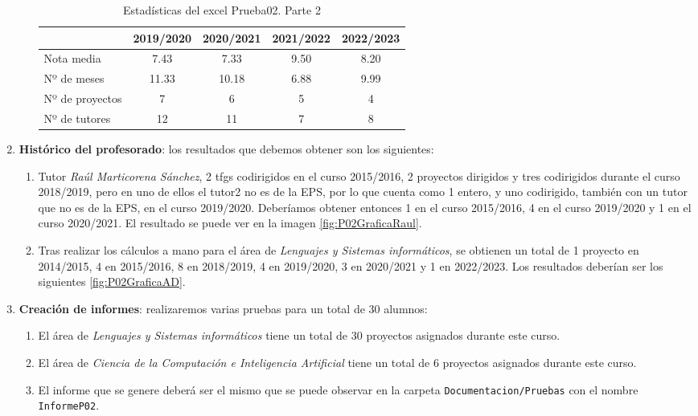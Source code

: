 \begin{enumerate}
\begin{enumerate}
	\begin{table}[]
		\label{P02Historico2}
		\centering
		\begin{tabular}{|l|c|c|c|c|}
			\hline
			\multicolumn{1}{|c|}{\textbf{}} & \textbf{2019/2020}
			& \textbf{2020/2021}	& \textbf{2021/2022} & \textbf{2022/2023}\\\hline
			Nota media & 7.43 &7.33 & 9.50& 8.20 \\ \hline
			Nº de meses  & 11.33 & 10.18& 6.88	& 9.99 \\ \hline
			Nº de proyectos    &7  &6 & 5	&4  \\ \hline
			Nº de tutores  & 12 &11 & 7	& 8   \\ \hline
		\end{tabular}
		\caption{Estadísticas del excel Prueba02. Parte 2}
	\end{table}
		
	\end{enumerate}
	
	\item \textbf{Histórico del profesorado}:  los resultados que debemos obtener son los siguientes:
	\begin{enumerate}
		\item Tutor \emph{Raúl Marticorena Sánchez}, 2 tfgs codirigidos en el curso 2015/2016, 2 proyectos dirigidos y tres codirigidos durante el curso 2018/2019, pero en uno de ellos el tutor2 no es de la EPS, por lo que cuenta como 1 entero, y uno codirigido, también con un tutor que no es de la EPS, en el curso 2019/2020. Deberíamos obtener entonces 1 en el curso 2015/2016, 4 en el curso 2019/2020 y 1 en el curso 2020/2021. El resultado se puede ver en la imagen \ref{fig:P02GraficaRaul}.
		
		\item Tras realizar los cálculos a mano para el área de  \emph{Lenguajes y Sistemas informáticos}, se obtienen un total de 1 proyecto en 2014/2015, 4 en 2015/2016, 8 en 2018/2019, 4 en 2019/2020, 3 en 2020/2021 y 1 en 2022/2023. Los resultados deberían ser los siguientes \ref{fig:P02GraficaAD}.
	\end{enumerate}	
	
	\item \textbf{Creación de informes}: realizaremos varias pruebas para un total de 30 alumnos:
	\begin{enumerate}
		\item El área de \emph{Lenguajes y Sistemas informáticos} tiene un total de 30 proyectos asignados durante este curso.
		\item El área de \emph{Ciencia de la Computación e Inteligencia Artificial} tiene un total de 6 proyectos asignados durante este curso.
		\item El informe que se genere deberá ser el mismo que se puede observar en la carpeta \texttt{Documentacion/Pruebas} con el nombre \texttt{InformeP02}.
	\end{enumerate}
\end{enumerate}

